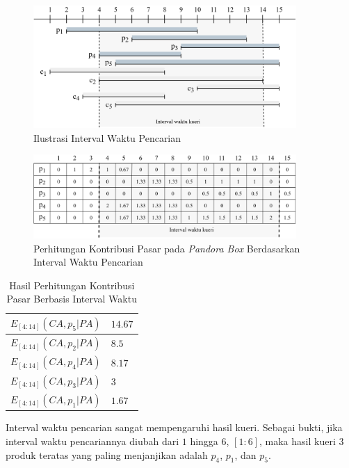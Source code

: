 \begin{figure}[h]
	\centering
	\includegraphics[width=10cm]{assets/img/bab3/timeline-interval.png}
	\caption{Ilustrasi Interval Waktu Pencarian}
	\label{fig:timeline-kueri}
\end{figure}

\begin{figure}[h]
	\centering
	\includegraphics[width=10cm]{assets/img/bab3/pbox-kueri.png}
	\caption{Perhitungan Kontribusi Pasar pada \textit{Pandora Box} Berdasarkan Interval Waktu Pencarian}
	\label{fig:pbox-kueri}
\end{figure}

\begin{table}[H]
	\small
	\centering
	\begin{tabular}{|p{4cm}|p{2cm}|}
		\hline
		$E_{[4:14]}(CA, p_5|PA)$ & $14.67$ \\ \hline
		$E_{[4:14]}(CA, p_2|PA)$ & $8.5$ \\ \hline
		$E_{[4:14]}(CA, p_4|PA)$ & $8.17$ \\ \hline
		$E_{[4:14]}(CA, p_3|PA)$ & $3$ \\ \hline
		$E_{[4:14]}(CA, p_1|PA)$ & $1.67$ \\ \hline
	\end{tabular} 
	\caption{Hasil Perhitungan Kontribusi Pasar Berbasis Interval Waktu}
	\label{tab:mc-ti-res}
\end{table}

Interval waktu pencarian sangat mempengaruhi hasil kueri. Sebagai bukti, jika interval waktu pencariannya diubah dari $1$ hingga $6$, $[1:6]$, maka hasil kueri $3$ produk teratas yang paling menjanjikan adalah $p_4$, $p_1$, dan $p_5$.

